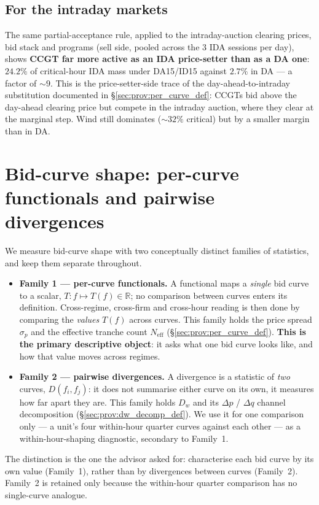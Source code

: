 \documentclass[11pt,a4paper]{article}
\begin{document}
\subsection{For the intraday markets}\label{sec:prov:pricesetter_ida}

\noindent The same partial-acceptance rule, applied to the intraday-auction clearing prices, bid stack and programs (sell side, pooled across the 3 IDA sessions per day), shows \textbf{CCGT far more active as an IDA price-setter than as a DA one}: $24.2\%$ of critical-hour IDA mass under DA15/ID15 against $2.7\%$ in DA --- a factor of $\sim 9$. This is the price-setter-side trace of the day-ahead-to-intraday substitution documented in \S\ref{sec:prov:per_curve_def}: CCGTs bid above the day-ahead clearing price but compete in the intraday auction, where they clear at the marginal step. Wind still dominates ($\sim 32\%$ critical) but by a smaller margin than in DA.


\section{Bid-curve shape: per-curve functionals and pairwise divergences}\label{sec:prov:dw_decomp}

\noindent We measure bid-curve shape with two conceptually distinct families of statistics, and keep them separate throughout.
\begin{itemize}\setlength{\itemsep}{3pt}
\item \textbf{Family 1 --- per-curve functionals.} A functional maps a \emph{single} bid curve to a scalar, $T: f \mapsto T(f) \in \mathbb{R}$; no comparison between curves enters its definition. Cross-regime, cross-firm and cross-hour reading is then done by comparing the \emph{values} $T(f)$ across curves. This family holds the price spread $\sigma_p$ and the effective tranche count $N_{\text{eff}}$ (\S\ref{sec:prov:per_curve_def}). \textbf{This is the primary descriptive object}: it asks what one bid curve looks like, and how that value moves across regimes.
\item \textbf{Family 2 --- pairwise divergences.} A divergence is a statistic of \emph{two} curves, $D(f_i, f_j)$: it does not summarise either curve on its own, it measures how far apart they are. This family holds $D_w$ and its $\Delta p$ / $\Delta q$ channel decomposition (\S\ref{sec:prov:dw_decomp_def}). We use it for one comparison only --- a unit's four within-hour quarter curves against each other --- as a within-hour-shaping diagnostic, secondary to Family~1.
\end{itemize}
\noindent The distinction is the one the advisor asked for: characterise each bid curve by its own value (Family~1), rather than by divergences between curves (Family~2). Family~2 is retained only because the within-hour quarter comparison has no single-curve analogue.
\end{document}
